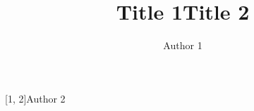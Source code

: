 \documentclass[11pt]{article}
\makeatletter
\newcommand{\cleartitle}[1]{
	\def\@title{}
	\def\@author{}
	\def\@affil{}
}
\makeatother
\begin{document}
	\author[1, 2]{Author 1}
	\title{Title 1}
	\maketitle
	\cleartitle
	
	
	\author[1, 2]{Author 2}
	\title{Title 2}
	\maketitle
\end{document}
